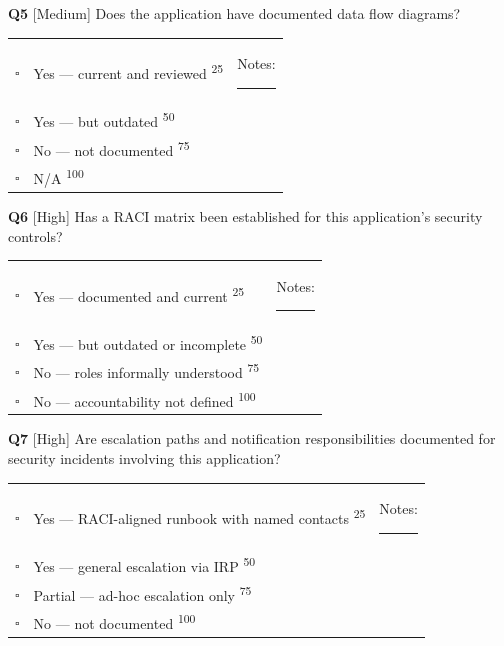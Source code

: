 \documentclass[11pt,landscape]{article}
\begin{document}
\vspace{0.3cm}

\noindent\colorbox{medbg}{\textbf{Q5} [Medium]} Does the application have documented data flow diagrams?

\begin{tabularx}{\textwidth}{cXX}
$\square$ & Yes --- current and reviewed \textsuperscript{\scriptsize\textcolor{stridegray}{25}} & Notes: \rule{4cm}{0.4pt} \\
$\square$ & Yes --- but outdated \textsuperscript{\scriptsize\textcolor{stridegray}{50}} &  \\
$\square$ & No --- not documented \textsuperscript{\scriptsize\textcolor{stridegray}{75}} &  \\
$\square$ & N/A \textsuperscript{\scriptsize\textcolor{stridegray}{100}} &  \\
\end{tabularx}

\vspace{0.3cm}

\noindent\colorbox{highbg}{\textbf{Q6} [High]} Has a RACI matrix been established for this application's security controls?

\begin{tabularx}{\textwidth}{cXX}
$\square$ & Yes --- documented and current \textsuperscript{\scriptsize\textcolor{stridegray}{25}} & Notes: \rule{4cm}{0.4pt} \\
$\square$ & Yes --- but outdated or incomplete \textsuperscript{\scriptsize\textcolor{stridegray}{50}} &  \\
$\square$ & No --- roles informally understood \textsuperscript{\scriptsize\textcolor{stridegray}{75}} &  \\
$\square$ & No --- accountability not defined \textsuperscript{\scriptsize\textcolor{stridegray}{100}} &  \\
\end{tabularx}

\vspace{0.3cm}

\noindent\colorbox{highbg}{\textbf{Q7} [High]} Are escalation paths and notification responsibilities documented for security incidents involving this application?

\begin{tabularx}{\textwidth}{cXX}
$\square$ & Yes --- RACI-aligned runbook with named contacts \textsuperscript{\scriptsize\textcolor{stridegray}{25}} & Notes: \rule{4cm}{0.4pt} \\
$\square$ & Yes --- general escalation via IRP \textsuperscript{\scriptsize\textcolor{stridegray}{50}} &  \\
$\square$ & Partial --- ad-hoc escalation only \textsuperscript{\scriptsize\textcolor{stridegray}{75}} &  \\
$\square$ & No --- not documented \textsuperscript{\scriptsize\textcolor{stridegray}{100}} &  \\
\end{tabularx}
\end{document}
